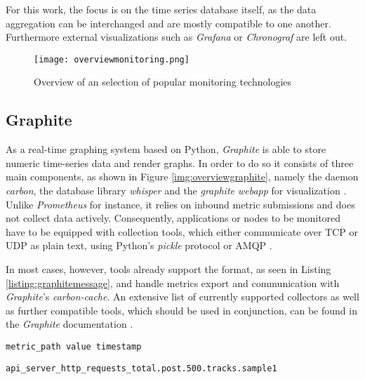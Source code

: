 For this work, the focus is on the time series database itself, as the data aggregation can be interchanged and are mostly compatible to one another.
Furthermore external visualizations such as \textit{Grafana} or \textit{Chronograf} are left out.

\begin{figure}
	\centering
	\texttt{[image: overviewmonitoring.png]}
	\caption{Overview of an selection of popular monitoring technologies}
	\label{img:overviewmonitoring}
\end{figure}

\subsection{Graphite}

As a real-time graphing system based on Python, \textit{Graphite} is able to store numeric time-series data and render graphs.
In order to do so it consists of three main components, as shown in Figure \ref{img:overviewgraphite}, namely the daemon \textit{carbon}, the database library \textit{whisper} and the \textit{graphite webapp} for visualization \cite{Davis.08.05.2020b}.
Unlike \textit{Prometheus} for instance, it relies on inbound metric submissions and does not collect data actively.
Consequently, applications or nodes to be monitored have to be equipped with collection tools, which either communicate over TCP or UDP as plain text, using Python's \textit{pickle} protocol or \ac{AMQP} \cite[p.~49]{Dixon.2017}\cite{Davis.08.05.2020c}.

In most cases, however, tools already support the format, as seen in Listing \ref{listing:graphitemessage}, and handle metrics export and communication with \textit{Graphite}'s \textit{carbon-cache}.
An extensive list of currently supported collectors as well as further compatible tools, which should be used in conjunction, can be found in the \textit{Graphite} documentation \cite{Davis.08.05.2020d}.

\begin{lstlisting}[caption=Graphite Message Format, label=listing:graphitemessage]
metric_path value timestamp
\end{lstlisting}

\begin{lstlisting}[caption=Graphite's dot oriented naming scheme, label=listing:graphitemetricnaming]
api_server_http_requests_total.post.500.tracks.sample1 
\end{lstlisting}

